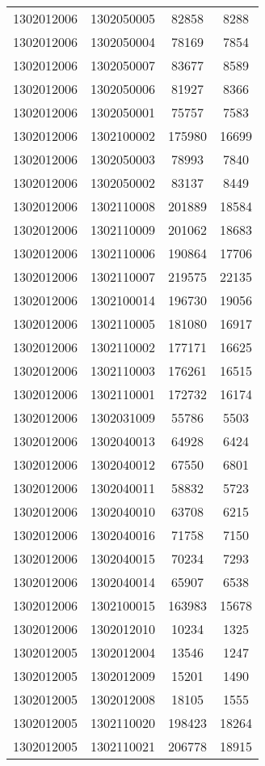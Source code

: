 \begin{longtable}[h]{llcc}
		1302012006 & 1302050005 & 82858 & 8288\\
		1302012006 & 1302050004 & 78169 & 7854\\
		1302012006 & 1302050007 & 83677 & 8589\\
		1302012006 & 1302050006 & 81927 & 8366\\
		1302012006 & 1302050001 & 75757 & 7583\\
		1302012006 & 1302100002 & 175980 & 16699\\
		1302012006 & 1302050003 & 78993 & 7840\\
		1302012006 & 1302050002 & 83137 & 8449\\
		1302012006 & 1302110008 & 201889 & 18584\\
		1302012006 & 1302110009 & 201062 & 18683\\
		1302012006 & 1302110006 & 190864 & 17706\\
		1302012006 & 1302110007 & 219575 & 22135\\
		1302012006 & 1302100014 & 196730 & 19056\\
		1302012006 & 1302110005 & 181080 & 16917\\
		1302012006 & 1302110002 & 177171 & 16625\\
		1302012006 & 1302110003 & 176261 & 16515\\
		1302012006 & 1302110001 & 172732 & 16174\\
		1302012006 & 1302031009 & 55786 & 5503\\
		1302012006 & 1302040013 & 64928 & 6424\\
		1302012006 & 1302040012 & 67550 & 6801\\
		1302012006 & 1302040011 & 58832 & 5723\\
		1302012006 & 1302040010 & 63708 & 6215\\
		1302012006 & 1302040016 & 71758 & 7150\\
		1302012006 & 1302040015 & 70234 & 7293\\
		1302012006 & 1302040014 & 65907 & 6538\\
		1302012006 & 1302100015 & 163983 & 15678\\
		1302012006 & 1302012010 & 10234 & 1325\\
		1302012005 & 1302012004 & 13546 & 1247\\
		1302012005 & 1302012009 & 15201 & 1490\\
		1302012005 & 1302012008 & 18105 & 1555\\
		1302012005 & 1302110020 & 198423 & 18264\\
		1302012005 & 1302110021 & 206778 & 18915\\

\end{longtable}
